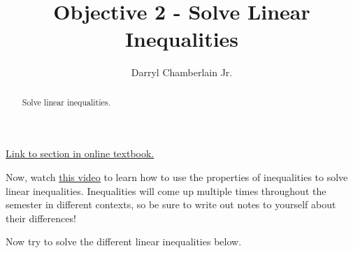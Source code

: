 \documentclass{ximera}
\author{Darryl Chamberlain Jr.}
\title{Objective 2 - Solve Linear Inequalities}
\begin{document}
\begin{abstract}
Solve linear inequalities. 
\end{abstract}
\maketitle

\href{https://cnx.org/contents/mwjClAV_@8.1:uIjtHMfW@9/Linear-Inequalities-and-Absolute-Value-Inequalities}{Link to section in online textbook.}


Now, watch \underline{\href{https://mediasite.video.ufl.edu/Mediasite/Play/ab04629334ac4cadb7a69beb924910651d}{this video}} to learn how to use the properties of inequalities to solve linear inequalities. Inequalities will come up multiple times throughout the semester in different contexts, so be sure to write out notes to yourself about their differences!

Now try to solve the different linear inequalities below. 
\end{document}
